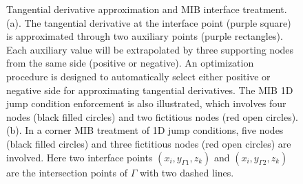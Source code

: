 \documentclass[dissertation]{uathesis}
\begin{document}
\begin{body}
\begin{flushleft}
%
\begin{figure}[!ht]
	\begin{center}
	\end{center}
	\caption{Tangential derivative approximation and MIB interface treatment. 
		(a). The tangential derivative at the interface point (purple square) is approximated through two auxiliary points (purple rectangles). Each auxiliary value will be extrapolated by three supporting nodes from the same side (positive or negative). An optimization procedure is designed to automatically select either positive or negative side for approximating tangential derivatives. The MIB 1D jump condition enforcement is also illustrated, which involves four nodes (black filled circles) and two fictitious nodes (red open circles). 
		(b). In a corner MIB treatment of 1D jump conditions,  five nodes (black filled circles) and three fictitious nodes (red open circles) are involved. Here two interface points $(x_i,y_{\Gamma1},z_k)$ and $(x_i,y_{\Gamma2},z_k)$ are the intersection points of $\Gamma$ with two dashed lines. }
	\label{fig:tangential_approximation}
\end{figure}
%


\end{flushleft}
\end{body}
\end{document}
